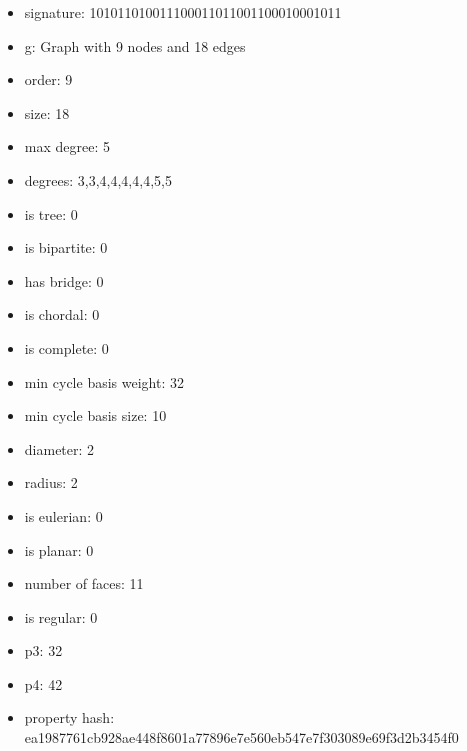 \newpage
\begin{figure}
\end{figure}
\begin{itemize}
\item signature: 101011010011100011011001100010001011
\item g: Graph with 9 nodes and 18 edges
\item order: 9
\item size: 18
\item max degree: 5
\item degrees: 3,3,4,4,4,4,4,5,5
\item is tree: 0
\item is bipartite: 0
\item has bridge: 0
\item is chordal: 0
\item is complete: 0
\item min cycle basis weight: 32
\item min cycle basis size: 10
\item diameter: 2
\item radius: 2
\item is eulerian: 0
\item is planar: 0
\item number of faces: 11
\item is regular: 0
\item p3: 32
\item p4: 42
\item property hash: ea1987761cb928ae448f8601a77896e7e560eb547e7f303089e69f3d2b3454f0
\end{itemize}
